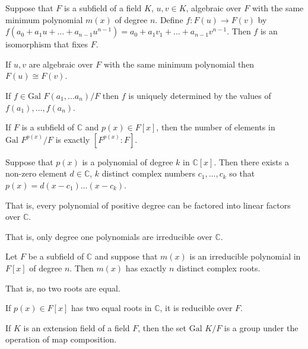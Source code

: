 \documentclass{article}
\newcommand{\C}{\mathbb C}
\newcommand{\gal}{\text{Gal }}
\begin{document}

Suppose that $F$ is a subfield of a field $K$, $u,v\in K$, algebraic over $F$ with the same minimum polynomial $m(x)$ of degree $n$. Define $f:F(u)\to F(v)$ by $f(a_0+a_1u+\hdots+a_{n-1}u^{n-1})=a_0+a_1v_1+\hdots+a_{n-1}v^{n-1}$. Then $f$ is an isomorphism that fixes $F$.


If $u,v$ are algebraic over $F$ with the same minimum polynomial then $F(u)\cong F(v)$.

\newpage


If $f\in\gal F(a_1, \hdots a_n)/F$ then $f$ is uniquely determined by the values of $f(a_1), \hdots, f(a_n)$.


If $F$ is a subfield of $\C$ and $p(x)\in F[x]$, then the number of elements in $\gal F^{p(x)}/F$ is exactly $[F^{p(x)}:F]$.


Suppose that $p(x)$ is a polynomial of degree $k$ in $\C[x]$. Then there exists a non-zero element $d\in\C$, $k$ distinct complex numbers $c_1,\hdots,c_k$ so that $p(x)=d(x-c_1)\hdots(x-c_k)$.

That is, every polynomial of positive degree can be factored into linear factors over $\C$.

That is, only degree one polynomials are irreducible over $\C$.


Let $F$ be a subfield of $\C$ and suppose that $m(x)$ is an irreducible polynomial in $F[x]$ of degree $n$. Then $m(x)$ has exactly $n$ distinct complex roots.

That is, no two roots are equal.


If $p(x)\in F[x]$ has two equal roots in $\C$, it is reducible over $F$.

\newpage


If $K$ is an extension field of a field $F$, then the set $\gal K/F$ is a group under the operation of map composition.

\end{document}
